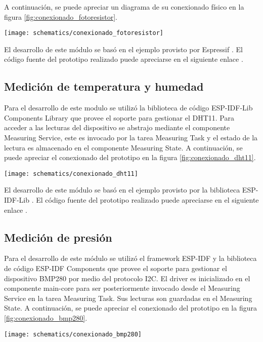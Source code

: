A continuación, se puede apreciar un diagrama de su conexionado físico en la figura \ref{fig:conexionado_fotoresistor}.

\begin{center}
\texttt{[image: schematics/conexionado\_fotoresistor]}
  \label{fig:conexionado_fotoresistor}
\end{center}

El desarrollo de este módulo se basó en el ejemplo provisto por Espressif \cite{ESP32_ADC1_Example}. El código fuente del prototipo realizado puede apreciarse en el siguiente enlace \cite{ESP32_POC_photoresistor}.

\subsection{Medición de temperatura y humedad}

Para el desarrollo de este modulo se utilizó la biblioteca de código ESP-IDF-Lib Components Library \cite{esp_idf_lib_website} que provee el soporte para gestionar el DHT11. Para acceder a las lecturas del dispositivo se abstrajo mediante el componente Measuring Service, este es invocado por la tarea Measuring Task y el estado de la lectura es almacenado en el componente Measuring State.
A continuación, se puede apreciar el conexionado del prototipo en la figura \ref{fig:conexionado_dht11}.

\begin{center}
\texttt{[image: schematics/conexionado\_dht11]}
  \label{fig:conexionado_dht11}
\end{center}

El desarrollo de este módulo se basó en el ejemplo provisto por la biblioteca ESP-IDF-Lib \cite{ESP32_dht11_example}. El código fuente del prototipo realizado puede apreciarse en el siguiente enlace \cite{ESP32_POC_dht11}.

\subsection{Medición de presión}
Para el desarrollo de este módulo se utilizó el framework ESP-IDF y la biblioteca de código ESP-IDF Components que provee el soporte para gestionar el dispositivo BMP280 por medio del protocolo I2C. El driver es inicializado en el componente main-core para ser posteriormente invocado desde el Measuring Service en la tarea Measuring Task. Sus lecturas son guardadas en el Measuring State. A continuación, se puede apreciar el conexionado del prototipo en la figura \ref{fig:conexionado_bmp280}.
\begin{center}
\texttt{[image: schematics/conexionado\_bmp280]}
  \label{fig:conexionado_bmp280}
\end{center}

